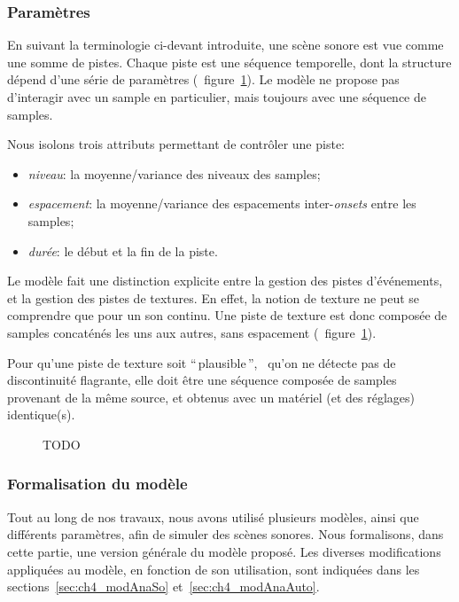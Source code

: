\subsubsection{Paramètres}
\label{sec:ch4_modelParam}

En suivant la terminologie ci-devant introduite, une scène sonore est vue comme une somme de pistes. Chaque piste est une séquence temporelle, dont la structure dépend d'une série de paramètres (\cf~figure~\ref{fig:modelSequence}). Le modèle ne propose pas d’interagir avec un sample en particulier, mais toujours avec une séquence de samples.

Nous isolons trois attributs permettant de contrôler une piste:

\begin{itemize}
\item \emph{niveau}: la moyenne/variance des niveaux des samples;
\item \emph{espacement}: la moyenne/variance des espacements inter-\emph{onsets} entre les samples;
\item \emph{durée}: le début et la fin de la piste.
\end{itemize}

Le modèle fait une distinction explicite entre la gestion des pistes d'événements, et la gestion des pistes de textures. En effet, la notion de texture ne peut se comprendre que pour un son continu. Une piste de texture est donc composée de samples concaténés les uns aux autres, sans espacement (\cf~figure~\ref{fig:modelSequence}). 

Pour qu'une piste de texture soit ``\,plausible\,'', \ie~qu'on ne détecte pas de discontinuité flagrante, elle doit être une séquence composée de samples provenant de la même source, et obtenus avec un matériel (et des réglages) identique(s).

\begin{figure}[t]
        \graphicspath{{gfx/ch_4/}}
        \myfloatalign
        \def\svgwidth{\linewidth}
        
       \caption{TODO}\label{fig:modelSequence}
\end{figure}

\subsubsection{Formalisation du modèle}
 \label{sec:ch4_modelForm}
 
 Tout au long de nos travaux, nous avons utilisé plusieurs modèles, ainsi que différents paramètres, afin de simuler des scènes sonores. Nous formalisons, dans cette partie, une version générale du modèle proposé. Les diverses modifications appliquées au modèle, en fonction de son utilisation, sont indiquées dans les sections~\ref{sec:ch4_modAnaSo} et~\ref{sec:ch4_modAnaAuto}.
 
